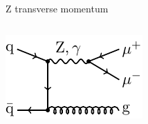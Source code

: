 \begin{frame}[t]{Z transverse momentum}
\fontsize{9}{11}\selectfont
\begin{columns}[T,onlytextwidth]
\begin{column}{.5\textwidth}
\hspace*{1.5cm}
\includegraphics[height=0.13\textheight]{ew_corrections/figures/fd08_z_pt_born}

\vspace*{0.2cm}


\end{column}
\end{columns}
\end{frame}
